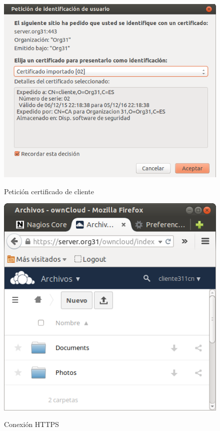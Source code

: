 \documentclass[]{article}
\begin{document}

\begin{figure}[h]
	\caption{Petición certificado de cliente}
	\centering
	\includegraphics[scale=0.5]{images/certs/pedircert.png}
	\label{fig:pedircert}
\end{figure}


\begin{figure}[h]
	\caption{Conexión HTTPS}
	\centering
	\includegraphics[scale=0.5]{images/certs/https.png}
	\label{fig:https}
\end{figure}
\end{document}
